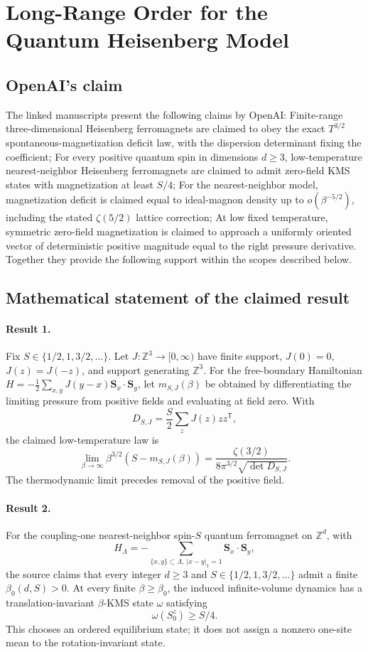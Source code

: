 \documentclass[11pt]{article}
\begin{document}
\section*{Long-Range Order for the Quantum Heisenberg Model}

\subsection{OpenAI's claim}
The linked manuscripts present the following claims by OpenAI: Finite-range three-dimensional Heisenberg ferromagnets are claimed to obey the exact $T^{3/2}$ spontaneous-magnetization deficit law, with the dispersion determinant fixing the coefficient; For every positive quantum spin in dimensions $d\geq3$, low-temperature nearest-neighbor Heisenberg ferromagnets are claimed to admit zero-field KMS states with magnetization at least $S/4$; For the nearest-neighbor model, magnetization deficit is claimed equal to ideal-magnon density up to $o(\beta^{-5/2})$, including the stated $\zeta(5/2)$ lattice correction; At low fixed temperature, symmetric zero-field magnetization is claimed to approach a uniformly oriented vector of deterministic positive magnitude equal to the right pressure derivative. Together they provide the following support within the scopes described below.

\subsection{Mathematical statement of the claimed result}
\paragraph{Result 1.} Fix \(S\in\{1/2,1,3/2,\ldots\}\). Let \(J:\mathbb Z^3\to[0,\infty)\) have finite support, \(J(0)=0\), \(J(z)=J(-z)\), and support generating \(\mathbb Z^3\). For the free-boundary Hamiltonian \(H=-\tfrac12\sum_{x,y}J(y-x)\boldsymbol S_x\cdot\boldsymbol S_y\), let \(m_{S,J}(\beta)\) be obtained by differentiating the limiting pressure from positive fields and evaluating at field zero. With
\[
 D_{S,J}=\frac S2\sum_zJ(z)zz^{\mathsf T},
\]
the claimed low-temperature law is
\[
 \lim_{\beta\to\infty}\beta^{3/2}(S-m_{S,J}(\beta))
 =\frac{\zeta(3/2)}{8\pi^{3/2}\sqrt{\det D_{S,J}}}.
\]
The thermodynamic limit precedes removal of the positive field.

\paragraph{Result 2.} For the coupling-one nearest-neighbor spin-\(S\) quantum ferromagnet on \(\mathbb Z^d\), with
\[
 H_\Lambda=-\sum_{\{x,y\}\subset\Lambda,\ |x-y|_1=1}\boldsymbol S_x\cdot\boldsymbol S_y,
\]
the source claims that every integer \(d\ge3\) and \(S\in\{1/2,1,3/2,\ldots\}\) admit a finite \(\beta_0(d,S)>0\). At every finite \(\beta\ge\beta_0\), the induced infinite-volume dynamics has a translation-invariant \(\beta\)-KMS state \(\omega\) satisfying
\[
 \omega(S_0^z)\ge S/4.
\]
This chooses an ordered equilibrium state; it does not assign a nonzero one-site mean to the rotation-invariant state.
\end{document}
